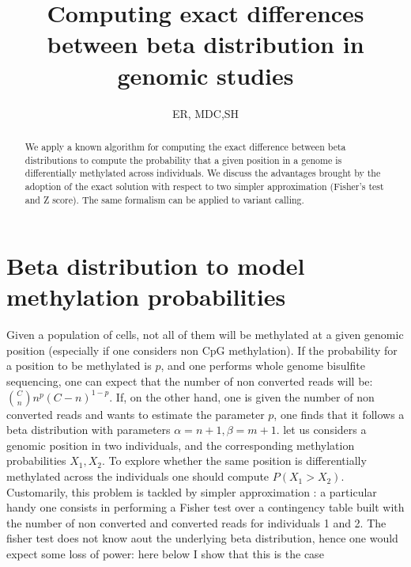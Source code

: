 \documentclass{amsart}
\title{Computing exact differences between beta distribution in genomic studies}
\author{ER, MDC,SH}
\begin{document}
\begin{abstract}
We apply a known algorithm for computing the exact difference between beta distributions
to compute the probability that a given position in a genome is differentially methylated across
individuals. We discuss the advantages brought by the adoption of the exact solution
with respect to two simpler approximation (Fisher's test and Z score).
The same formalism can be applied to variant calling.
\end{abstract}
\maketitle

\section{Beta distribution to model methylation probabilities}
Given a population of cells, not all of them will be methylated at a given
genomic position (especially if one considers non CpG methylation).
If the probability for a position to be methylated is $p$, and one performs whole genome
bisulfite sequencing, one can expect that the number of non converted reads  will be:
${C \choose n}n^p(C-n)^{1-p}$.
If, on the other hand, one is given the number of non converted reads and wants to estimate the parameter $p$, one finds that it follows a beta distribution with parameters $\alpha=n+1,\beta=m+1$.
let us considers a genomic position in two individuals, and the corresponding methylation probabilities $X_1,X_2$. To explore whether the same position is differentially methylated across the individuals one
should compute $P(X_1>X_2)$. Customarily, this problem is tackled by simpler approximation : a particular handy one consists in performing a Fisher test over a contingency table built with the number of non converted and converted reads for individuals 1 and 2.
The fisher  test does not know aout the underlying beta distribution, hence one would expect some loss of power: here below I show that this is the case
\end{document}
